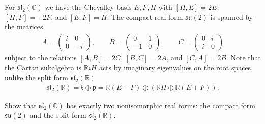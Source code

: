 \documentclass[12pt]{article}
\begin{document}
\begin{example}
    For $\mathfrak{sl}_2(\mathbb C)$ we have the Chevalley basis $E,F,H$ with $[H,E]=2E$, $[H,F]=-2F$, and $[E,F]=H$. The compact real form $\mathfrak{su}(2)$ is spanned by the matrices \begin{align*}
        A = \begin{pmatrix}i&0\\0&-i\end{pmatrix},\qquad B=\begin{pmatrix}0&1\\-1&0\end{pmatrix},\qquad C= \begin{pmatrix}0&i\\i&0\end{pmatrix}
    \end{align*} subject to the relations $[A,B]=2C$, $[B,C]=2A$, and $[C,A]=2B$. Note that the Cartan subalgebra is $\mathbb RiH$ acts by imaginary eigenvalues on the root spaces, unlike the split form $\mathfrak{sl}_2(\mathbb R)$ \begin{align*}
        \mathfrak{sl}_2(\mathbb R) = \mathfrak k\oplus\mathfrak p = \mathbb R(E-F) \oplus \left(\mathbb RH\oplus \mathbb R(E+F)\right).
    \end{align*}
\end{example}

\begin{exercise}
    Show that $\mathfrak{sl}_2(\mathbb C)$ has exactly two nonisomorphic real forms: the compact form $\mathfrak{su}(2)$ and the split form $\mathfrak{sl}_2(\mathbb R)$.
\end{exercise}
\end{document}
